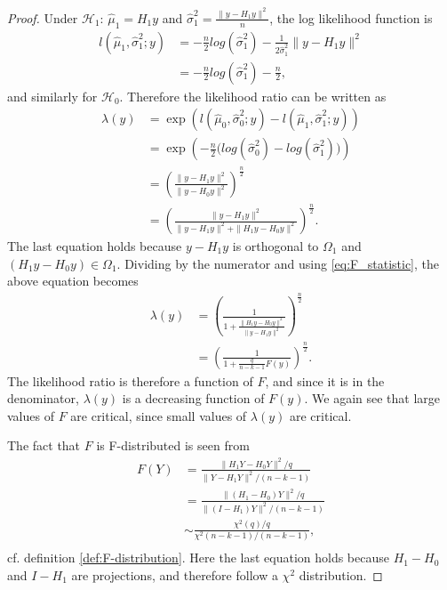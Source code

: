 \begin{proof}
    Under $\mathcal{H}_1$: $\hat{\mu}_1 = H_1 y$ and $\hat{\sigma}_1^2 = \frac{\| y - H_1 y \|^2}{n}$, the log likelihood function is
    \begin{align*}
        l(\hat{\mu}_1, \hat{\sigma}_1^2; y) &= -\frac{n}{2} log(\hat{\sigma}_1^2) - \frac{1}{2 \hat{\sigma}_1^2} \| y - H_1 y \|^2 \\
        &= -\frac{n}{2} log(\hat{\sigma}_1^2) - \frac{n}{2},
    \end{align*}
    and similarly for $\mathcal{H}_0$. Therefore the likelihood ratio can be written as
    \begin{align*}
        \lambda(y) &= \exp \left( l(\hat{\mu}_0, \hat{\sigma}_0^2; y) - l(\hat{\mu}_1, \hat{\sigma}_1^2; y) \right) \\
        &= \exp \left( -\frac{n}{2} \Big( log(\hat{\sigma}_0^2) - log(\hat{\sigma}_1^2)\Big) \right) \\
        &= \left( \frac{\| y - H_1 y \|^2}{\| y - H_0 y \|^2} \right)^{\frac{n}{2}} \\
        &= \left( \frac{\| y - H_1 y \|^2}{\| y - H_1 y \|^2 + \| H_1 y - H_0 y \|^2} \right)^{\frac{n}{2}}.
    \end{align*}
    The last equation holds because $y - H_1 y$ is orthogonal to $\Omega_1$ and $(H_1 y - H_0 y) \in \Omega_1$. 
    Dividing by the numerator and using \eqref{eq:F_statistic}, the above equation becomes
    \begin{align*}
        \lambda(y) &= \left( \frac{1}{1 + \frac{\| H_1 y - H_0 y \|^2}{\| y - H_1 y \|^2}} \right)^{\frac{n}{2}} \\
        &= \left( \frac{1}{1 + \frac{q}{n-k-1}F(y)}  \right)^{\frac{n}{2}}.
    \end{align*}
    The likelihood ratio is therefore a function of $F$, and since it is in the denominator, $\lambda(y)$ is a decreasing function of $F(y)$. We again see that large values of $F$ are critical, since small values of $\lambda(y)$ are critical.
    
    The fact that $F$ is F-distributed is seen from
    \begin{align*}
        F(Y) &= \frac{\| H_1 Y - H_0 Y \|^2/q}{\| Y - H_1 Y \|^2/(n-k-1)} \\
        &= \frac{\| (H_1 - H_0) Y \|^2/q}{\| (I - H_1) Y \|^2/(n-k-1)} \\
        &\sim \frac{\chi^2(q)/q}{\chi^2(n-k-1)/(n-k-1)}, \\
    \end{align*}
    cf. definition \ref{def:F-distribution}. Here the last equation holds because $H_1 - H_0$ and $I - H_1$ are projections, and therefore follow a $\chi^2$ distribution.
\end{proof}

